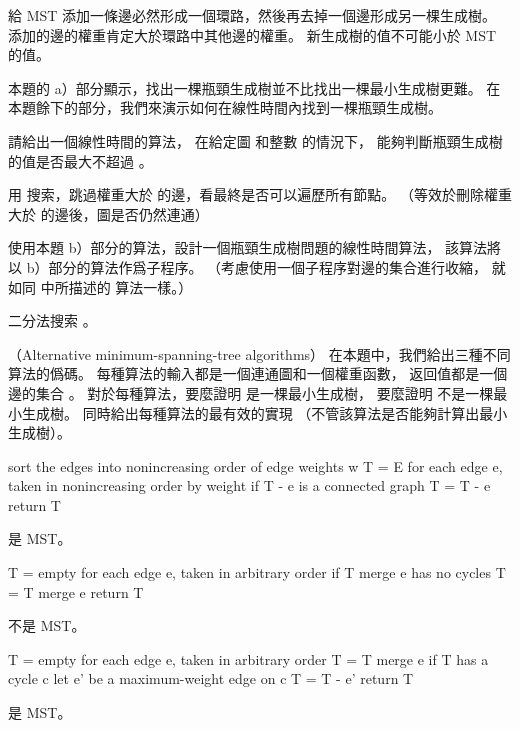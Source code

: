 \startANSWER
給 MST 添加一條邊必然形成一個環路，然後再去掉一個邊形成另一棵生成樹。
添加的邊的權重肯定大於環路中其他邊的權重。
新生成樹的值不可能小於 MST 的值。
\stopANSWER

本題的 a）部分顯示，找出一棵瓶頸生成樹並不比找出一棵最小生成樹更難。
在本題餘下的部分，我們來演示如何在線性時間內找到一棵瓶頸生成樹。

\startigBase[continue]\startitem
請給出一個線性時間的算法，
在給定圖  和整數  的情況下，
能夠判斷瓶頸生成樹的值是否最大不超過 。
\stopitem\stopigBase

\startANSWER
用  搜索，跳過權重大於  的邊，看最終是否可以遍歷所有節點。
（等效於刪除權重大於  的邊後，圖是否仍然連通）
\stopANSWER

\startigBase[continue]\startitem
使用本題 b）部分的算法，設計一個瓶頸生成樹問題的線性時間算法，
該算法將以 b）部分的算法作爲子程序。
（\hint 考慮使用一個子程序對邊的集合進行收縮，
就如同 中所描述的  算法一樣。）
\stopitem\stopigBase

\startANSWER
二分法搜索 。
\stopANSWER
\stopPROBLEM

\startPROBLEM
（Alternative minimum-spanning-tree algorithms）
在本題中，我們給出三種不同算法的僞碼。
每種算法的輸入都是一個連通圖和一個權重函數，
返回值都是一個邊的集合 。
對於每種算法，要麼證明  是一棵最小生成樹，
要麼證明  不是一棵最小生成樹。
同時給出每種算法的最有效的實現
（不管該算法是否能夠計算出最小生成樹）。

\startigBase[a]\startitem
{}

\startCLRS
sort the edges into nonincreasing order of edge weights w
T = E
for each edge e, taken in nonincreasing order by weight
	if T - {e} is a connected graph
		T = T - {e}
return T
\stopCLRS
\stopitem\stopigBase

\startANSWER
是 MST。
\stopANSWER

\startigBase[continue]\startitem
{}

\startCLRS
T = empty
for each edge e, taken in arbitrary order
	if T merge {e} has no cycles
		T = T merge {e}
return T
\stopCLRS
\stopitem\stopigBase

\startANSWER
不是 MST。
\stopANSWER

\startigBase[continue]\startitem
{}

\startCLRS
T = empty
for each edge e, taken in arbitrary order
	T = T merge {e}
	if T has a cycle c
		let e' be a maximum-weight edge on c
		T = T - {e'}
return T
\stopCLRS
\stopitem\stopigBase

\startANSWER
是 MST。
\stopANSWER

\stopPROBLEM

\stopsubject%
